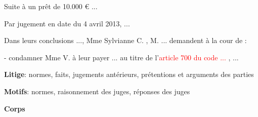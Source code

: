 \begin{frame}[t]{\mysubsectiontitle}
\begin{columns}
\begin{column}{.55\linewidth}
{\begin{minipage}{\textwidth}
{\begin{minipage}{0.95\textwidth}
						Suite à un prêt de 10.000 € ...
						
						Par jugement en date du 4 avril 2013, ...
						
						Dans leurs conclusions ..., Mme Sylvianne C. , M. ... 
						demandent à la cour de :
						
						- condamner Mme V. à leur payer ... au titre de  l'\textcolor{red}{article 700 du code ...} , ...
			\end{minipage}}		
			\vspace{0.1cm}
			
			{\textbf{Litige}: normes, faits, jugements antérieurs, prétentions et arguments des parties}
			
			\vspace{0.4cm}
			
			\vspace{0.1cm}
			
			{\textbf{Motifs}: normes, raisonnement des juges, réponses des juges}		 
		\end{minipage}}
		\vspace{0.1cm}
		
		{\textbf{Corps}}
						
	\end{column}
\end{columns}
\end{frame}

